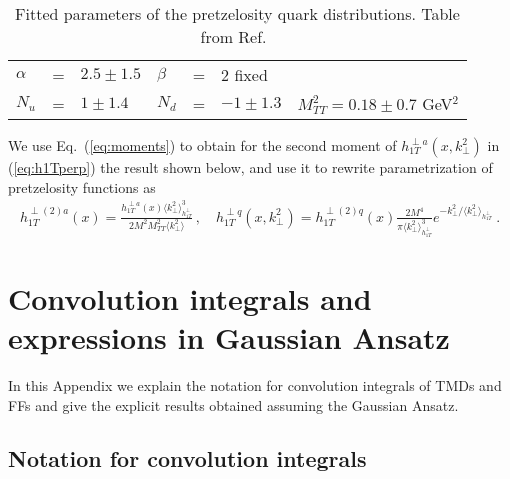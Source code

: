 \documentclass[a4paper,11pt]{article}
\newcommand{\ba}{\begin{eqnarray}}
\newcommand{\ea}{\end{eqnarray}}
\newcommand{\la}{\langle}
\newcommand{\ra}{\rangle}
\def\kperp{k_\perp}
\def\avkperp{\la \kperp^2 \ra}
\begin{document}
%
\begin{table}[t]
\centering
\begin{tabular}{l c l l c l l}
\hline
$\alpha$ &=& $2.5\pm1.5$ & $\beta$ &=& $2$ fixed \\
 $N_{u}$ &=& $1 \pm 1.4$ & $N_{d}$ &=& $-1 \pm 1.3$ &
 $M_{TT}^2=0.18 \pm  0.7$ GeV$^2$\\
\hline
\end{tabular}
\caption{Fitted parameters of the pretzelosity quark distributions. Table from Ref.~\cite{Lefky:2014eia}}
\label{fitparI}
\end{table}
%

We use Eq.~(\ref{eq:moments}) to obtain for the second moment
of $ h_{1T}^{\perp a}(x,\kperp^2)$ in (\ref{eq:h1Tperp}) the result
shown below, and use it to rewrite parametrization of pretzelosity
functions as
\ba
h_{1T}^{\perp (2) a}(x) =  \frac{h^{\perp a}_{1T}(x) \avkperp_{h_{1T}^\perp}^3}{2 M^2 M_{TT}^2 \avkperp} \, , \quad
h_{1T}^{\perp q}(x,\kperp^2) =  h_{1T}^{\perp (2) q}(x)   \frac{2 M^4}{\pi \avkperp_{h_{1T}^\perp}^3} e^{-\kperp^2/{\avkperp_{h_{1T}^\perp}}}
\label{pretzelosity_new} \ .
\ea

\section{Convolution integrals and expressions in Gaussian Ansatz}
\label{App:factor}

In this Appendix we explain the notation for convolution integrals
of TMDs and FFs and give the explicit results obtained assuming the
Gaussian Ansatz.

\subsection{Notation for convolution integrals \label{ApendixB1}}
\end{document}
